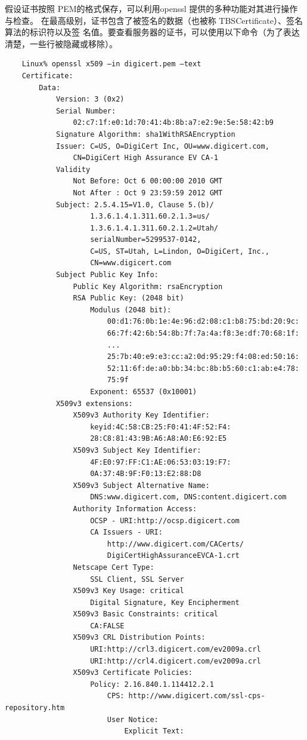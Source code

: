 假设证书按照 PEM的格式保存，可以利用openssl 提供的多种功能对其进行操作与检查。
在最高级别，证书包含了被签名的数据（也被称 TBSCertificate）、签名算法的标识符以及签
名值。要查看服务器的证书，可以使用以下命令（为了表达清楚，一些行被隐藏或移除）。
\begin{verbatim}
    Linux% openssl x509 –in digicert.pem –text
    Certificate:
        Data:
            Version: 3 (0x2)
            Serial Number:
                02:c7:1f:e0:1d:70:41:4b:8b:a7:e2:9e:5e:58:42:b9
            Signature Algorithm: sha1WithRSAEncryption
            Issuer: C=US, O=DigiCert Inc, OU=www.digicert.com,
                CN=DigiCert High Assurance EV CA-1
            Validity
                Not Before: Oct 6 00:00:00 2010 GMT
                Not After : Oct 9 23:59:59 2012 GMT
            Subject: 2.5.4.15=V1.0, Clause 5.(b)/
                    1.3.6.1.4.1.311.60.2.1.3=us/
                    1.3.6.1.4.1.311.60.2.1.2=Utah/
                    serialNumber=5299537-0142,
                    C=US, ST=Utah, L=Lindon, O=DigiCert, Inc.,
                    CN=www.digicert.com
            Subject Public Key Info:
                Public Key Algorithm: rsaEncryption
                RSA Public Key: (2048 bit)
                    Modulus (2048 bit):
                        00:d1:76:0b:1e:4e:96:d2:08:c1:b8:75:bd:20:9c:
                        66:7f:42:6b:54:8b:7f:7a:4a:f8:3e:df:70:68:1f:
                        ...
                        25:7b:40:e9:e3:cc:a2:0d:95:29:f4:08:ed:50:16:
                        52:11:6f:de:a0:bb:34:bc:8b:b5:60:c1:ab:e4:78:
                        75:9f
                    Exponent: 65537 (0x10001)
            X509v3 extensions:
                X509v3 Authority Key Identifier:
                    keyid:4C:58:CB:25:F0:41:4F:52:F4:
                    28:C8:81:43:9B:A6:A8:A0:E6:92:E5
                X509v3 Subject Key Identifier:
                    4F:E0:97:FF:C1:AE:06:53:03:19:F7:
                    0A:37:4B:9F:F0:13:E2:88:D8
                X509v3 Subject Alternative Name:
                    DNS:www.digicert.com, DNS:content.digicert.com
                Authority Information Access:
                    OCSP - URI:http://ocsp.digicert.com
                    CA Issuers - URI:
                        http://www.digicert.com/CACerts/
                        DigiCertHighAssuranceEVCA-1.crt
                Netscape Cert Type:
                    SSL Client, SSL Server
                X509v3 Key Usage: critical
                    Digital Signature, Key Encipherment
                X509v3 Basic Constraints: critical
                    CA:FALSE
                X509v3 CRL Distribution Points:
                    URI:http://crl3.digicert.com/ev2009a.crl
                    URI:http://crl4.digicert.com/ev2009a.crl
                X509v3 Certificate Policies:
                    Policy: 2.16.840.1.114412.2.1
                        CPS: http://www.digicert.com/ssl-cps-repository.htm
                        User Notice:
                            Explicit Text:


\end{verbatim}
